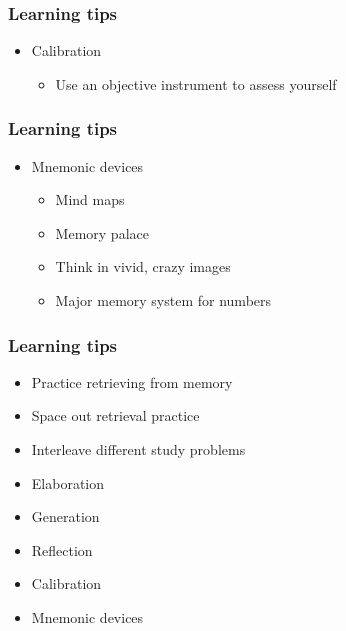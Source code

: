 \documentclass{beamer}
\newcommand{\bi}{\begin{itemize}}
\newcommand{\li}{\item}
\newcommand{\ei}{\end{itemize}}
\newcommand{\bfr}[1]{\begin{frame}[fragile]\frametitle{{ #1 }}}
\begin{document}
\bfr{Learning tips}
\bi
\li Calibration
\bi\li Use an objective instrument to assess yourself \ei
\ei
\end{frame}

\bfr{Learning tips}
\bi
\li Mnemonic devices
\bi
\li Mind maps
\li Memory palace
\li Think in vivid, crazy images
\li Major memory system for numbers
\ei
\ei
\end{frame}



\bfr{Learning tips}
\bi
\li Practice retrieving from memory
\li Space out retrieval practice
\li Interleave different study problems
\li Elaboration
\li Generation
\li Reflection
\li Calibration
\li Mnemonic devices
\ei
\end{frame}
\end{document}
